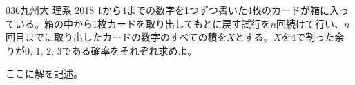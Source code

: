 \begin{thm}{036}{}{九州大 理系 2018}
 1から4までの数字を1つずつ書いた4枚のカードが箱に入っている。箱の中から1枚カードを取り出してもとに戻す試行を$n$回続けて行い、$n$回目までに取り出したカードの数字のすべての積を$X$とする。$X$を4で割った余りが0, 1, 2, 3である確率をそれぞれ求めよ。
\end{thm}

ここに解を記述。